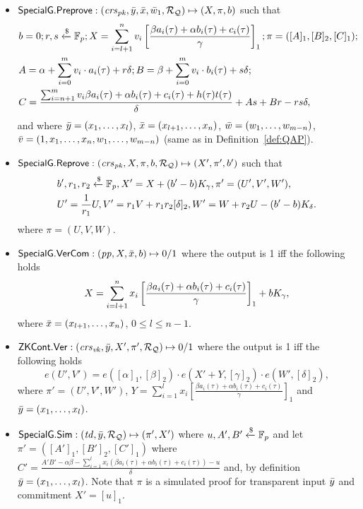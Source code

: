 \begin{definition}
\begin{itemize}
\item ${\mathsf{SpecialG}}.{\mathsf{Preprove}}: (\mathit{crs}_{\mathit{pk}}, \bar{y}, \bar{x}, \bar{w}_1, \mathcal{R}_{\mathcal{Q}}) \mapsto (X, \pi, b)$ such that \\
\begin{align*}
&b = 0; r, s\xleftarrow{\$} \mathbb{F}_p; X = \sum_{i=l+1}^{n} v_i\left[ \frac{\beta a_i(\tau)+ \alpha b_i(\tau)+ c_i(\tau)}{\gamma} \right]_1; \pi = ([A]_1, [B]_2, [C]_1); \\
&A = \alpha + \sum_{i=0}^{m} v_i \cdot a_i(\tau) + r\delta; B = \beta + \sum_{i=0}^{m} v_i \cdot b_i(\tau) + s\delta; \\ 
&C = \frac{\sum_{i=n+1}^{m} v_i \beta a_i(\tau)+ \alpha b_i(\tau)+ c_i(\tau) + h(\tau)t(\tau)}{\delta}   + As + Br - rs\delta, 
\end{align*}
and where $\bar{y} = (x_1, \ldots, x_l)$, $\bar{x} = (x_{l+1}, \ldots, x_n)$, $\bar{w} = (w_1, \ldots, w_{m-n})$, \\
$\bar{v} = (1, x_1, \ldots, x_n, w_1, \ldots, w_{m-n})$ (same as in Definition~\ref{def:QAP}).


\item ${\mathsf{SpecialG}}.{\mathsf{Reprove}}: (\mathit{crs}_{\mathit{pk}}, X, \pi, b, \mathcal{R}_{\mathcal{Q}}) \mapsto (X', \pi', b')$  such that
\begin{align*}
&b ', r_1, r_2  \xleftarrow{\$} \mathbb{F}_p, X' = X + (b'- b) K_{\gamma}, \pi' = (U', V', W'), \\
&U' = \frac{1}{r_1} U, V' = r_1 V + r_1r_2[\delta]_2, W' = W + r_2U  - (b' - b) K_{\delta} .
\end{align*}
\noindent where $\pi = (U, V, W)$.
 
\item ${\mathsf{SpecialG}}.{\mathsf{VerCom}}: (\mathit{pp}, X, \bar{x}, b) \mapsto 0/1$ where the output is 1 iff the following holds
$$X = \sum_{i=l+1}^{n} x_i\left[ \frac{\beta a_i(\tau)+ \alpha b_i(\tau)+ c_i(\tau)}{\gamma} \right]_1  + b K_{\gamma},$$
where $\bar{x} = (x_{l+1}, \ldots, x_n)$, $ 0 \leq l \leq n-1$. 
\item ${\mathsf{ZKCont}}.{\mathsf{Ver}}: (\mathit{crs}_{\mathit{vk}}, \bar{y}, X', \pi', \mathcal{R}_{\mathcal{Q}}) \mapsto 0/1$ where the output is 1 iff the following holds 
$$e(U',V') = e([\alpha]_1, [\beta]_2) \cdot e(X' + Y, [\gamma]_2) \cdot e(W', [\delta]_2),$$
where $\pi' = (U', V', W')$, $Y = \sum_{i=1}^{l} x_i\left[ \frac{\beta a_i(\tau)+ \alpha b_i(\tau)+ c_i(\tau)}{\gamma} \right]_1$ 
and $\bar{y} = (x_1, \ldots, x_l)$.

\item ${\mathsf{SpecialG}}.{\mathsf{Sim}}: (\mathit{td}, \bar{y}, \mathcal{R}_{\mathcal{Q}}) \mapsto (\pi', X')$ where $u, A', B' \xleftarrow {\$} \mathbb{F}_p$ and let \\
$\pi' = ([A']_1, [B']_2, [C']_1)$ where $C' = \frac{A'B' - \alpha \beta - \sum_{i=1}^{l} x_i (\beta a_i(\tau)+ \alpha b_i(\tau)+ c_i(\tau))- u}{\delta}  $ and, 
by definition $\bar{y} = (x_1, \ldots, x_l)$. Note that $\pi$ is a simulated proof for transparent input $\bar{y}$ and commitment $X' = [u]_1$.
\end{itemize} 
\end{definition}

